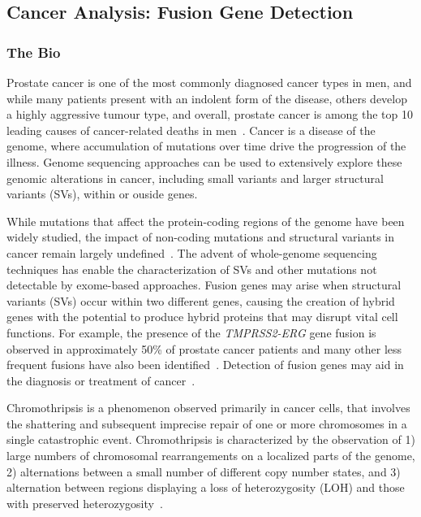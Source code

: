 \subsection{Cancer Analysis: Fusion Gene Detection}
\subsubsection{The Bio}

Prostate cancer is one of the most commonly diagnosed cancer types in men, and while many patients present with an indolent form of the disease, others develop a highly aggressive tumour type, and overall, prostate cancer is among the top 10 leading causes of cancer-related deaths in men~\cite{jemal2010global}. Cancer is a disease of the genome, where accumulation of mutations over time drive the progression of the illness. Genome sequencing approaches can be used to extensively explore these genomic alterations in cancer, including small variants and larger structural variants (SVs), within or ouside genes.

While mutations that affect the protein-coding regions of the genome have been widely studied, the impact of non-coding mutations and structural variants in cancer remain largely undefined~\cite{cuykendall2017non,khurana2016role}. The advent of whole-genome sequencing techniques has enable the characterization of SVs and other mutations not detectable by exome-based approaches. Fusion genes may arise when structural variants (SVs) occur within two different genes, causing the creation of hybrid genes with the potential to produce hybrid proteins that may disrupt vital cell functions.  For example, the presence of the \emph{TMPRSS2-ERG} gene fusion is observed in approximately 50\% of prostate cancer patients and many other less frequent fusions have also been identified~\cite{tomlins2005recurrent}. Detection of fusion genes may aid in the diagnosis or treatment of cancer~\cite{nowell1960chromosome,nowell1961chromosome,druker2001activity,druker2001efficacy}.

Chromothripsis is a phenomenon observed primarily in cancer cells, that involves the shattering and subsequent imprecise repair of one or more chromosomes in a single catastrophic event. Chromothripsis is characterized by the observation of 1) large numbers of chromosomal rearrangements on a localized parts of the genome, 2) alternations between a small number of different copy number states, and 3) alternation between regions displaying a loss of heterozygosity (LOH) and those with preserved heterozygosity~\cite{maher2012chromothripsis}.

